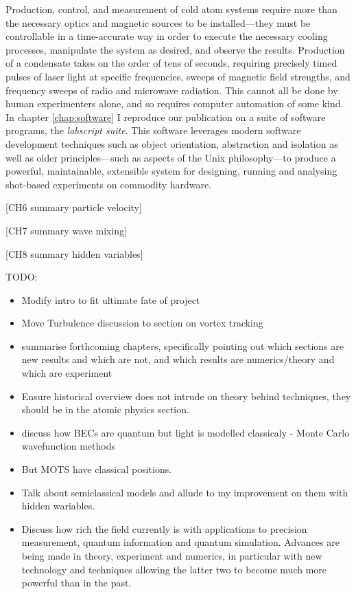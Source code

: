 Production, control, and measurement of cold atom systems require more than the necessary optics and magnetic sources to be installed---they must be controllable in a time-accurate way in order to execute the necessary cooling processes, manipulate the system as desired, and observe the results. Production of a condensate takes on the order of tens of seconds, requiring precisely timed pulses of laser light at specific frequencies, sweeps of magnetic field strengths, and frequency sweeps of radio and microwave radiation. This cannot all be done by human experimenters alone, and so requires computer automation of some kind. In chapter \ref{chap:software} I reproduce our publication on a suite of software programs, the \emph{labscript suite}. This software leverages modern software development techniques such as object orientation, abstraction and isolation as well as older principles---such as aspects of the Unix philosophy---to produce a powerful, maintainable, extensible system for designing, running and analysing shot-based experiments on commodity hardware.

[CH6 summary particle velocity]

[CH7 summary wave mixing]

[CH8 summary hidden variables]



TODO:
\begin{itemize}
\item Modify intro to fit ultimate fate of project
\item Move Turbulence discussion to section on vortex tracking
\item summarise forthcoming chapters, specifically pointing out which sections are new results and which are not, and which results are numerics/theory and which are experiment
\item Ensure historical overview does not intrude on theory behind techniques, they should be in the atomic physics section.
\item discuss how BECs are quantum but light is modelled classicaly - Monte Carlo wavefunction methods
\item But MOTS have classical positions.
\item Talk about semiclassical models and allude to my improvement on them with hidden wariables.
\item Discuss how rich the field currently is with applications to precision measurement, quantum information and quantum simulation. Advances are being made in theory, experiment and numerics, in particular with new technology and techniques allowing the latter two to become much more powerful than in the past.
\end{itemize}

